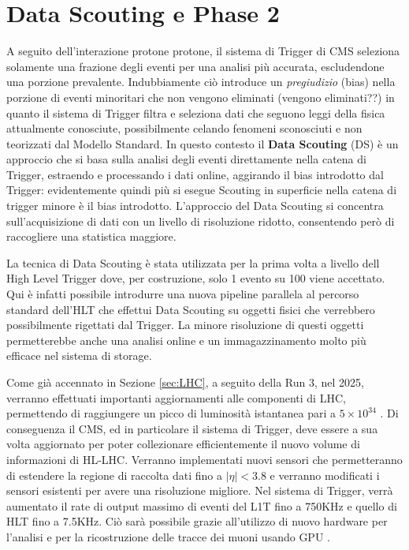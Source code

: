 \section{Data Scouting e Phase 2}
\label{sec:DataScouting}


A seguito dell'interazione protone protone, il sistema di Trigger di CMS seleziona solamente una frazione degli eventi per una analisi più accurata, escludendone una porzione prevalente. Indubbiamente ciò introduce un \textit{pregiudizio} (bias) nella porzione di eventi minoritari che non vengono eliminati (vengono eliminati??) in quanto il sistema di Trigger filtra e seleziona dati che seguono leggi della fisica attualmente conosciute, possibilmente celando fenomeni sconosciuti e non teorizzati dal Modello Standard. \newline
In questo contesto il \textbf{ Data Scouting} (DS) è un approccio che si basa sulla analisi degli eventi direttamente nella catena di Trigger, estraendo e processando i dati online, aggirando il bias introdotto dal Trigger: evidentemente quindi più si esegue Scouting in superficie nella catena di trigger minore è il bias introdotto. L'approccio del Data Scouting si concentra sull'acquisizione di dati con un livello di risoluzione ridotto, consentendo però di raccogliere una statistica maggiore.

La tecnica di Data Scouting è stata utilizzata per la prima volta a livello dell High Level Trigger dove, per costruzione, solo 1 evento su 100 viene accettato. Qui è infatti possibile introdurre una nuova pipeline parallela al percorso standard dell'HLT che effettui Data Scouting su oggetti fisici che verrebbero possibilmente rigettati dal Trigger. La minore risoluzione di questi oggetti permetterebbe anche una analisi online e un immagazzinamento molto più efficace nel sistema di storage. 

Come già accennato in Sezione \ref{sec:LHC}, a seguito della Run 3, nel 2025, verranno effettuati importanti aggiornamenti alle componenti di LHC, permettendo di raggiungere un picco di luminosità istantanea pari a $5 \times 10^{34}$ \Lumi. Di conseguenza il CMS, ed in particolare il sistema di Trigger, deve essere a sua volta aggiornato per poter collezionare efficientemente il nuovo volume di informazioni di HL-LHC. Verranno implementati nuovi sensori che permetteranno di estendere la regione di raccolta dati fino a $|\eta| < 3.8$ e verranno modificati i sensori esistenti per avere una risoluzione migliore. Nel sistema di Trigger, verrà aumentato il rate di output massimo di eventi del L1T fino a 750KHz e quello di HLT fino a 7.5KHz. Ciò sarà possibile grazie all'utilizzo di nuovo hardware per l'analisi e per la ricostruzione delle tracce dei muoni usando GPU \cite{collaboration2021phase}.

